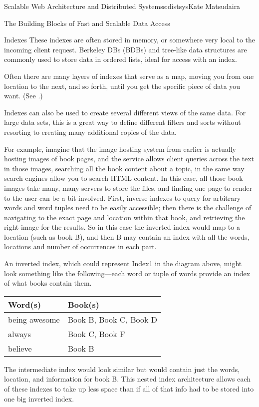 \begin{aosachapter}{Scalable Web Architecture and Distributed Systems}{s:distsys}{Kate Matsudaira}
\begin{aosasect1}{The Building Blocks of Fast and Scalable Data Access}
\begin{aosasect2}{Indexes}
These indexes are often stored in memory, or somewhere very local to
the incoming client request. Berkeley DBs (BDBs) and tree-like
data structures are commonly used to store data in ordered lists,
ideal for access with an index.

Often there are many layers of indexes that serve as a
map, moving you from one location to the next, and so forth, until
you get the specific piece of data you want. (See .)


Indexes can also be used to create several different views of the same
data. For large data sets, this is a great way to define different
filters and sorts without resorting to creating many additional copies
of the data.

For example, imagine that the image hosting system from earlier is
actually hosting images of book pages, and the service allows client
queries across the text in those images, searching all the book
content about a topic, in the same way search engines allow you to
search HTML content. In this case, all those book images take many,
many servers to store the files, and finding one page to render to the
user can be a bit involved. First, inverse indexes to
query for arbitrary words and word tuples need to be easily
accessible; then there is the challenge of navigating to the exact
page and location within that book, and retrieving the right image for
the results. So in this case the inverted index would map to a
location (such as book B), and then B may contain an index with all
the words, locations and number of occurrences in each part.

An inverted index, which could represent Index1 in the diagram above,
might look something like the following---each word or tuple of words
provide an index of what books contain them.

\begin{tabular}{|l|l|}
\hline
Word(s) & Book(s) \\
\hline
being awesome & Book B, Book C, Book D \\
always & Book C, Book F \\
believe & Book B \\
\hline
\end{tabular}

The intermediate index would look similar but would contain just the
words, location, and information for book B. This nested index
architecture allows each of these indexes to take up less space than
if all of that info had to be stored into one big inverted index.


\end{aosasect2}
\end{aosasect1}
\end{aosachapter}
